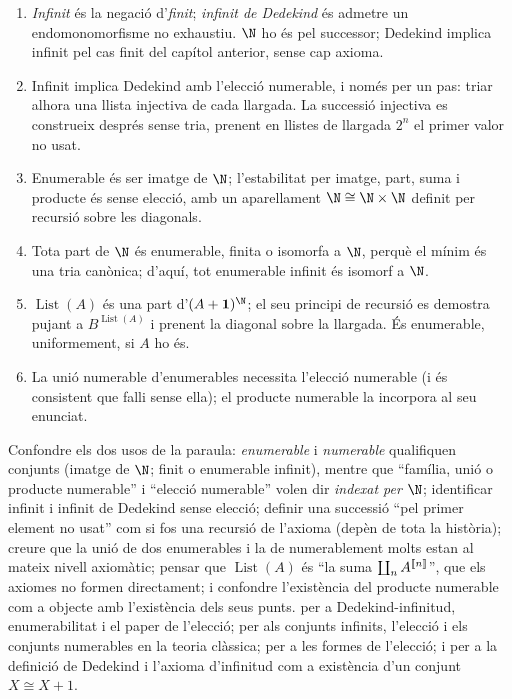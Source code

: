 \begin{resumcap}
\begin{enumerate}
  \item \emph{Infinit} és la negació d'\emph{finit}; \emph{infinit de Dedekind} és admetre un endomonomorfisme no exhaustiu. \(\N\) ho és pel successor; Dedekind implica infinit pel cas finit del capítol anterior, sense cap axioma.
  \item Infinit implica Dedekind amb l'elecció numerable, i només per un pas: triar alhora una llista injectiva de cada llargada. La successió injectiva es construeix després sense tria, prenent en llistes de llargada \(2^n\) el primer valor no usat.
  \item Enumerable és ser imatge de \(\N\); l'estabilitat per imatge, part, suma i producte és sense elecció, amb un aparellament \(\N\cong\N\times\N\) definit per recursió sobre les diagonals.
  \item Tota part de \(\N\) és enumerable, finita o isomorfa a \(\N\), perquè el mínim és una tria canònica; d'aquí, tot enumerable infinit és isomorf a \(\N\).
  \item \(\operatorname{List}(A)\) és una part d'\((A+\mathbf1)^{\N}\); el seu principi de recursió es demostra pujant a \(B^{\operatorname{List}(A)}\) i prenent la diagonal sobre la llargada. És enumerable, uniformement, si \(A\) ho és.
  \item La unió numerable d'enumerables necessita l'elecció numerable (i és consistent que falli sense ella); el producte numerable la incorpora al seu enunciat.
\end{enumerate}
 Confondre els dos usos de la paraula: \emph{enumerable} i \emph{numerable} qualifiquen conjunts (imatge de \(\N\); finit o enumerable infinit), mentre que \enquote{família, unió o producte numerable} i \enquote{elecció numerable} volen dir \emph{indexat per \(\N\)}; identificar infinit i infinit de Dedekind sense elecció; definir una successió \enquote{pel primer element no usat} com si fos una recursió de l'axioma (depèn de tota la història); creure que la unió de dos enumerables i la de numerablement molts estan al mateix nivell axiomàtic; pensar que \(\operatorname{List}(A)\) és \enquote{la suma \(\coprod_nA^{\llbracket n\rrbracket}\)}, que els axiomes no formen directament; i confondre l'existència del producte numerable com a objecte amb l'existència dels seus punts.
 \cite[§§7.6--7.8]{lawvere-rosebrugh} per a Dedekind-infinitud, enumerabilitat i el paper de l'elecció; \cite[§§13, 15--16 i 23]{halmos} per als conjunts infinits, l'elecció i els conjunts numerables en la teoria clàssica; \cite[apèndix~B]{lawvere-rosebrugh} per a les formes de l'elecció; i \cite[pàg.~12]{bell2006} per a la definició de Dedekind i l'axioma d'infinitud com a existència d'un conjunt \(X\cong X+1\).
\end{resumcap}
